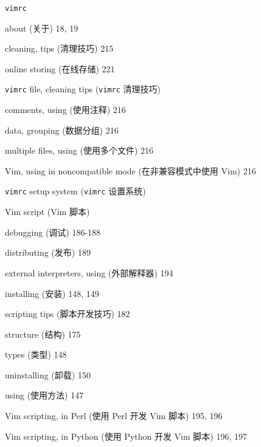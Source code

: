 \begin{multicols}{2}
\hangindent=3pc  \texttt{vimrc} \par
\hangindent=3pc \quad about (关于) 18, 19 \par
\hangindent=3pc \quad cleaning, tips (清理技巧) 215 \par
\hangindent=3pc \quad online storing (在线存储) 221 \par

\hangindent=3pc  \texttt{vimrc} file, cleaning tips (\texttt{vimrc} 清理技巧) \par
\hangindent=3pc \quad comments, using (使用注释) 216 \par
\hangindent=3pc \quad data, grouping (数据分组) 216 \par
\hangindent=3pc \quad multiple files, using (使用多个文件) 216 \par
\hangindent=3pc \quad Vim, using in noncompatible mode (在非兼容模式中使用 Vim) 216 \par

\hangindent=3pc  \texttt{vimrc} setup system (\texttt{vimrc} 设置系统) \par

\hangindent=3pc  Vim script (Vim 脚本) \par
\hangindent=3pc \quad debugging (调试) 186-188 \par
\hangindent=3pc \quad distributing (发布) 189 \par
\hangindent=3pc \quad external interpreters, using (外部解释器) 194 \par
\hangindent=3pc \quad installing (安装) 148, 149 \par
\hangindent=3pc \quad scripting tips (脚本开发技巧) 182 \par
\hangindent=3pc \quad structure (结构) 175 \par
\hangindent=3pc \quad types (类型) 148 \par
\hangindent=3pc \quad uninstalling (卸载) 150 \par
\hangindent=3pc \quad using (使用方法) 147 \par

\hangindent=3pc  Vim scripting, in Perl (使用 Perl 开发 Vim 脚本) 195, 196

\hangindent=3pc  Vim scripting, in Python (使用 Python 开发 Vim 脚本) 196, 197


\end{multicols}
